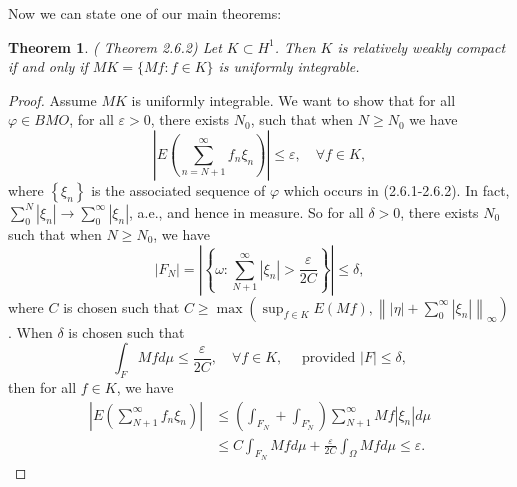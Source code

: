 \documentclass[reqno]{amsart}
\newtheorem{thm}{Theorem}[section]
\numberwithin{equation}{section}
\begin{document}
Now we can state one of our main theorems:

\begin{thm}{(\cite{Long} Theorem 2.6.2)} Let ${K} \subset H^{1}$. Then ${K}$ is relatively weakly compact if and only if $M{K} = \{Mf : f \in {K}\}$ is uniformly integrable.
\end{thm}
\begin{proof}
Assume $M K$ is uniformly integrable. We want to show that for all $\varphi \in B M O$, for all $\varepsilon>0$, there exists $N_0$, such that when $N \geq N_0$ we have
$$
\left|E\left(\sum_{n=N+1}^{\infty} f_n \xi_n\right)\right| \leq \varepsilon, \quad \forall f \in K,
$$
where $\left\{\xi_n\right\}$ is the associated sequence of $\varphi$ which occurs in (2.6.1-2.6.2). In fact, $\sum_0^N\left|\xi_n\right| \rightarrow \sum_0^{\infty}\left|\xi_n\right|$, a.e., and hence in measure. So for all $\delta>0$, there exists $N_0$ such that when $N \geq N_0$, we have
$$
\left|F_N\right|=\left|\left\{\omega: \sum_{N+1}^{\infty}\left|\xi_n\right|>\frac{\varepsilon}{2 C}\right\}\right| \leq \delta,
$$
where $C$ is chosen such that $C \geq \max \left(\sup _{f \in K} E(M f),\left\||\eta|+\sum_0^{\infty}\left|\xi_n\right|\right\|_{\infty}\right)$. When $\delta$ is chosen such that
$$
\int_F M f d \mu \leq \frac{\varepsilon}{2 C}, \quad \forall f \in K, \quad \text { provided }|F| \leq \delta,
$$
then for all $f \in K$, we have
$$
\begin{aligned}
\left|E\left(\sum_{N+1}^{\infty} f_n \xi_n\right)\right| & \leq\left(\int_{F_N}+\int_{F_N^{\circ}}\right) \sum_{N+1}^{\infty} M f\left|\xi_n\right| d \mu \\
& \leq C \int_{F_N} M f d \mu+\frac{\varepsilon}{2 C} \int_{\Omega} M f d \mu \leq \varepsilon .
\end{aligned}
$$


\end{proof}
\end{document}
